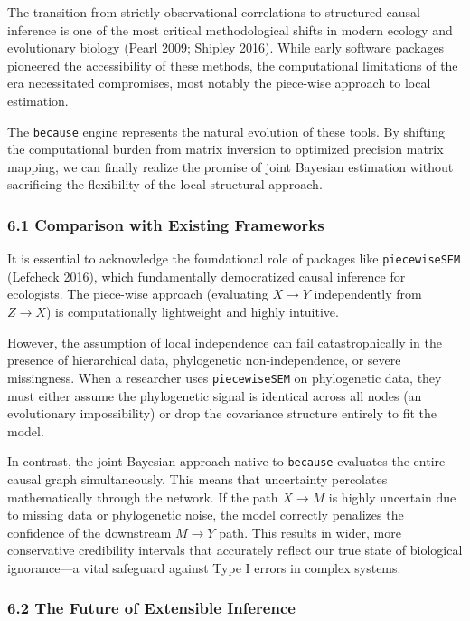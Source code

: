 \documentclass[
]{article}
\begin{document}
The transition from strictly observational correlations to structured causal inference is one of the most critical methodological shifts in modern ecology and evolutionary biology (Pearl 2009; Shipley 2016). While early software packages pioneered the accessibility of these methods, the computational limitations of the era necessitated compromises, most notably the piece-wise approach to local estimation.

The \texttt{because} engine represents the natural evolution of these tools. By shifting the computational burden from matrix inversion to optimized precision matrix mapping, we can finally realize the promise of joint Bayesian estimation without sacrificing the flexibility of the local structural approach.

\subsubsection{6.1 Comparison with Existing Frameworks}\label{comparison-with-existing-frameworks}

It is essential to acknowledge the foundational role of packages like \texttt{piecewiseSEM} (Lefcheck 2016), which fundamentally democratized causal inference for ecologists. The piece-wise approach (evaluating \(X \rightarrow Y\) independently from \(Z \rightarrow X\)) is computationally lightweight and highly intuitive.

However, the assumption of local independence can fail catastrophically in the presence of hierarchical data, phylogenetic non-independence, or severe missingness. When a researcher uses \texttt{piecewiseSEM} on phylogenetic data, they must either assume the phylogenetic signal is identical across all nodes (an evolutionary impossibility) or drop the covariance structure entirely to fit the model.

In contrast, the joint Bayesian approach native to \texttt{because} evaluates the entire causal graph simultaneously. This means that uncertainty percolates mathematically through the network. If the path \(X \rightarrow M\) is highly uncertain due to missing data or phylogenetic noise, the model correctly penalizes the confidence of the downstream \(M \rightarrow Y\) path. This results in wider, more conservative credibility intervals that accurately reflect our true state of biological ignorance---a vital safeguard against Type I errors in complex systems.

\subsubsection{6.2 The Future of Extensible Inference}\label{the-future-of-extensible-inference}
\end{document}
